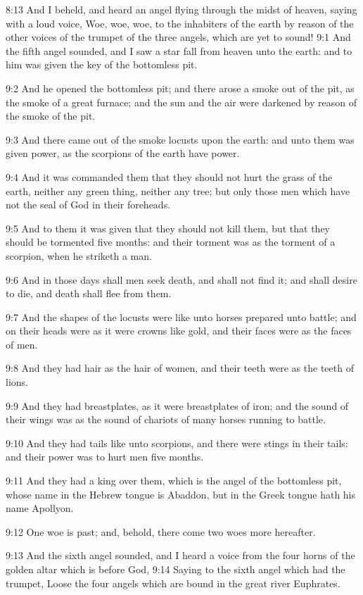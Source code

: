 8:13 And I beheld, and heard an angel flying through the midst of
heaven, saying with a loud voice, Woe, woe, woe, to the inhabiters of
the earth by reason of the other voices of the trumpet of the three
angels, which are yet to sound!  9:1 And the fifth angel sounded, and
I saw a star fall from heaven unto the earth: and to him was given the
key of the bottomless pit.

9:2 And he opened the bottomless pit; and there arose a smoke out of
the pit, as the smoke of a great furnace; and the sun and the air were
darkened by reason of the smoke of the pit.

9:3 And there came out of the smoke locusts upon the earth: and unto
them was given power, as the scorpions of the earth have power.

9:4 And it was commanded them that they should not hurt the grass of
the earth, neither any green thing, neither any tree; but only those
men which have not the seal of God in their foreheads.

9:5 And to them it was given that they should not kill them, but that
they should be tormented five months: and their torment was as the
torment of a scorpion, when he striketh a man.

9:6 And in those days shall men seek death, and shall not find it; and
shall desire to die, and death shall flee from them.

9:7 And the shapes of the locusts were like unto horses prepared unto
battle; and on their heads were as it were crowns like gold, and their
faces were as the faces of men.

9:8 And they had hair as the hair of women, and their teeth were as
the teeth of lions.

9:9 And they had breastplates, as it were breastplates of iron; and
the sound of their wings was as the sound of chariots of many horses
running to battle.

9:10 And they had tails like unto scorpions, and there were stings in
their tails: and their power was to hurt men five months.

9:11 And they had a king over them, which is the angel of the
bottomless pit, whose name in the Hebrew tongue is Abaddon, but in the
Greek tongue hath his name Apollyon.

9:12 One woe is past; and, behold, there come two woes more hereafter.

9:13 And the sixth angel sounded, and I heard a voice from the four
horns of the golden altar which is before God, 9:14 Saying to the
sixth angel which had the trumpet, Loose the four angels which are
bound in the great river Euphrates.

